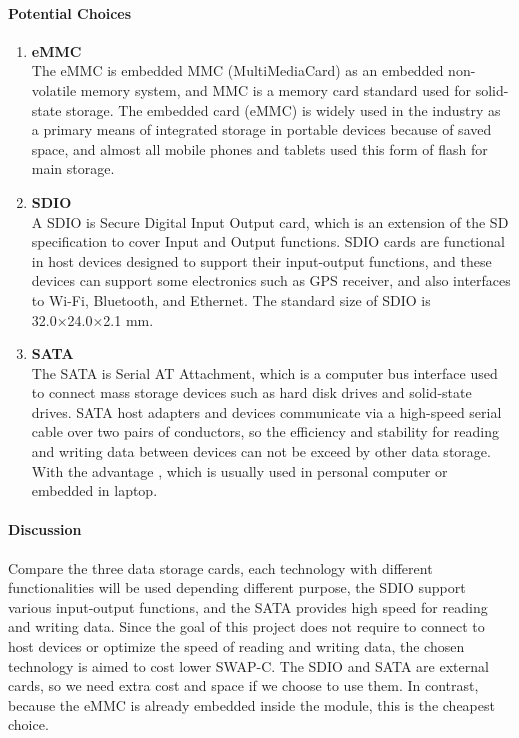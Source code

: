 \paragraph{Potential Choices}
\begin{enumerate}
\item\textbf{eMMC}\\
The eMMC is embedded MMC (MultiMediaCard) as an embedded non-volatile memory system, and MMC is a 
memory card standard used for solid-state storage. The embedded card (eMMC) is widely used in the 
industry as a primary means of integrated storage in portable devices because of saved space, and 
almost all mobile phones and tablets used this form of flash for main storage. \\

\item\textbf{SDIO}\\
A SDIO is Secure Digital Input Output card, which is an extension of the SD specification to cover 
Input and Output functions. SDIO cards are functional in host devices designed to support their 
input-output functions, and these devices can support some electronics such as GPS receiver, and 
also interfaces to Wi-Fi, Bluetooth, and Ethernet. The standard size of SDIO is 32.0×24.0×2.1 mm. \\

\item\textbf{SATA}\\
The SATA is Serial AT Attachment, which is a computer bus interface used to connect mass storage 
devices such as hard disk drives and solid-state drives. SATA host adapters and devices communicate 
via a high-speed serial cable over two pairs of conductors, so the efficiency and stability for 
reading and writing data between devices can not be exceed by other data storage. With the advantage
, which is usually used in personal computer or embedded in laptop. \\
\end{enumerate}

\paragraph{Discussion}
Compare the three data storage cards, each technology with different functionalities will be used 
depending different purpose, the SDIO support various input-output functions, and the SATA provides high 
speed for reading and writing data. Since the goal of this project does not require to connect to host 
devices or optimize the speed of reading and writing data, the chosen technology is aimed to cost lower 
SWAP-C. The SDIO and SATA are external cards, so we need extra cost and space if we choose to use them. 
In contrast, because the eMMC is already embedded inside the module, this is the cheapest choice.\\

